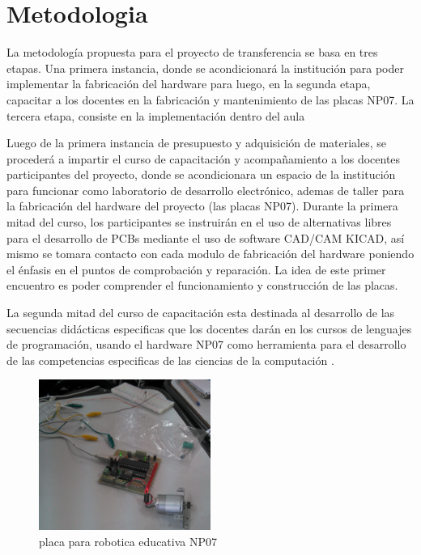 \section{Metodologia}

La metodología propuesta para el proyecto de transferencia se basa en tres etapas. Una primera instancia, donde se acondicionará la institución para poder implementar la fabricación del hardware para luego, en la segunda etapa, capacitar a los docentes en la fabricación y mantenimiento de las placas NP07. La tercera etapa, consiste en la implementación dentro del aula

Luego de la primera instancia de presupuesto y adquisición de materiales, se procederá a impartir el curso de capacitación y acompañamiento a los docentes participantes del proyecto, donde se acondicionara un espacio de la institución para funcionar como laboratorio de desarrollo electrónico, ademas de taller para la fabricación del hardware del proyecto (las placas NP07). Durante la primera mitad del curso, los participantes se instruirán en el uso de alternativas libres para el desarrollo de PCBs mediante el uso de software CAD/CAM KICAD, así mismo se tomara contacto con cada modulo de fabricación del hardware poniendo el énfasis en el puntos de comprobación y reparación. La idea de este primer encuentro es poder comprender el funcionamiento y construcción de las placas.

La segunda mitad del curso de capacitación esta destinada al desarrollo de las secuencias didácticas especificas que los docentes darán en los cursos de lenguajes de programación, usando el hardware NP07 como herramienta para el desarrollo de las competencias especificas de las ciencias de la computación \citep{sadosky2013cc}.

\begin{figure}[htb]
  \begin{center}
    \includegraphics[width=0.5\textwidth]{figuras/np07.jpg}
    \caption[Caption for LOF]{placa para robotica educativa NP07}
    
    \label{fig:placa_np07}
  \end{center}
\end{figure}

